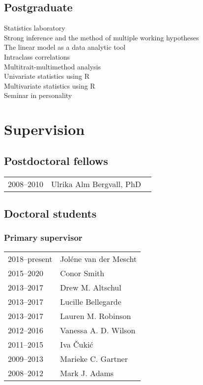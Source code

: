 \documentclass[11pt]{article}
\begin{document}
\subsection*{Postgraduate}
Statistics laboratory \\
Strong inference and the method of multiple working hypotheses \\
The linear model as a data analytic tool \\
Intraclass correlations \\
Multitrait-multimethod analysis \\
Univariate statistics using R \\
Multivariate statistics using R \\
Seminar in personality

\section*{Supervision}
\subsection*{Postdoctoral fellows}

\begin{tabular}{p{3cm}p{12cm}}
2008--2010 & Ulrika Alm Bergvall, PhD \
\end{tabular}

\subsection*{Doctoral students}

\subsubsection*{Primary supervisor}
\begin{tabular}{p{3cm}p{12cm}}
2018--present & Joléne van der Mescht \\
2015--2020 & Conor Smith \\
2013--2017 & Drew M. Altschul \\
2013--2017 & Lucille Bellegarde \\
2013--2017 & Lauren M. Robinson \\
2012--2016 & Vanessa A. D. Wilson \\
2011--2015 & Iva Čukić \\
2009--2013 & Marieke C. Gartner \\
2008--2012 & Mark J. Adams
\end{tabular}
\end{document}
